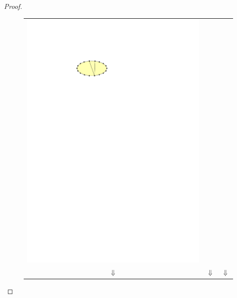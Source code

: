 \documentclass[12pt]{article}
\theoremstyle{definition}
\begin{document}
\begin{proof}
\begin{figure}
\begin{tabular}{ccc}
      \includegraphics[page=5]{figs/minimal} \\
      $\Downarrow$ & $\Downarrow$ & $\Downarrow$ \\

\end{tabular}
\end{figure}
\end{proof}
\end{document}
